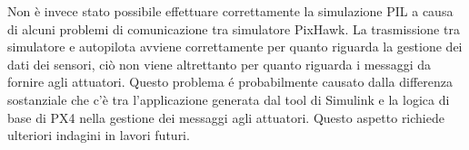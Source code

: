 \begin{commento}
Non è invece stato possibile effettuare correttamente la simulazione PIL a causa di alcuni problemi di comunicazione tra simulatore PixHawk. La trasmissione tra simulatore e autopilota avviene correttamente per quanto riguarda la gestione dei dati dei sensori, ciò non viene altrettanto per quanto riguarda i messaggi da fornire agli attuatori. Questo problema é probabilmente causato dalla differenza sostanziale che c'è tra l'applicazione generata dal tool di Simulink e la logica di base di PX4 nella gestione dei messaggi agli attuatori. Questo aspetto richiede ulteriori indagini in lavori futuri.


\end{commento}